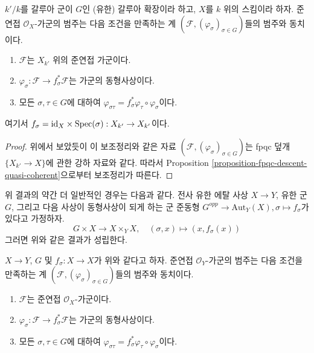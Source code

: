 \begin{lemma}
\label{lemma-galois-descent}
$k'/k$를 갈루아 군이 $G$인 (유한) 갈루아 확장이라 하고, $X$를 $k$ 위의
스킴이라 하자. 준연접 $\mathcal{O}_X$-가군의 범주는 다음 조건을 만족하는
계 $(\mathcal{F}, (\varphi_\sigma)_{\sigma \in G})$들의 범주와 동치이다.
\begin{enumerate}
\item $\mathcal{F}$는 $X_{k'}$ 위의 준연접 가군이다.
\item $\varphi_\sigma : \mathcal{F} \to f_\sigma^*\mathcal{F}$는 가군의
동형사상이다.
\item 모든 $\sigma, \tau \in G$에 대하여
$\varphi_{\sigma\tau} = f_\sigma^*\varphi_\tau \circ \varphi_\sigma$이다.
\end{enumerate}
여기서 $f_\sigma = \text{id}_X \times \mathop{\mathrm{Spec}}(\sigma) : X_{k'} \to X_{k'}$이다.
\end{lemma}

\begin{proof}
위에서 보았듯이 이 보조정리와 같은 자료
$(\mathcal{F}, (\varphi_\sigma)_{\sigma \in G})$는 fpqc 덮개
$\{X_{k'} \to X\}$에 관한 강하 자료와 같다. 따라서 Proposition
\ref{proposition-fpqc-descent-quasi-coherent}으로부터 보조정리가 따른다.
\end{proof}

\noindent
위 결과의 약간 더 일반적인 경우는 다음과 같다. 전사 유한 에탈 사상
$X \to Y$, 유한 군 $G$, 그리고 다음 사상이 동형사상이 되게 하는 군 준동형
$G^{opp} \to \text{Aut}_Y(X), \sigma \mapsto f_\sigma$가 있다고 가정하자.
$$
G \times X \longrightarrow X \times_Y X,\quad
(\sigma, x) \longmapsto (x, f_\sigma(x))
$$
그러면 위와 같은 결과가 성립한다.

\begin{lemma}
\label{lemma-galois-descent-more-general}
$X \to Y$, $G$ 및 $f_\sigma : X \to X$가 위와 같다고 하자. 준연접
$\mathcal{O}_Y$-가군의 범주는 다음 조건을 만족하는 계
$(\mathcal{F}, (\varphi_\sigma)_{\sigma \in G})$들의 범주와 동치이다.
\begin{enumerate}
\item $\mathcal{F}$는 준연접 $\mathcal{O}_X$-가군이다.
\item $\varphi_\sigma : \mathcal{F} \to f_\sigma^*\mathcal{F}$는 가군의
동형사상이다.
\item 모든 $\sigma, \tau \in G$에 대하여
$\varphi_{\sigma\tau} = f_\sigma^*\varphi_\tau \circ \varphi_\sigma$이다.
\end{enumerate}
\end{lemma}

